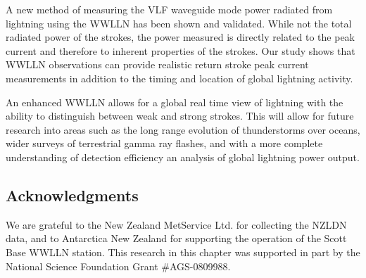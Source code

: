 A new method of measuring the VLF waveguide mode power radiated from lightning using the WWLLN has been shown and validated.
While not the total radiated power of the strokes, the power measured is directly related to the peak current and therefore to inherent properties of the strokes.
Our study shows that WWLLN observations can provide realistic return stroke peak current measurements in addition to the timing and location of global lightning activity.

An enhanced WWLLN allows for a global real time view of lightning with the ability to distinguish between weak and strong strokes.
This will allow for future research into areas such as the long range evolution of thunderstorms over oceans, wider surveys of terrestrial gamma ray flashes, and with a more complete understanding of detection efficiency an analysis of global lightning power output.

\subsection*{Acknowledgments} 
We are grateful to the New Zealand MetService Ltd. for collecting the NZLDN data, and to Antarctica New Zealand for supporting the operation of the Scott Base WWLLN station.
This research in this chapter was supported in part by the National Science Foundation Grant \#AGS-0809988.
